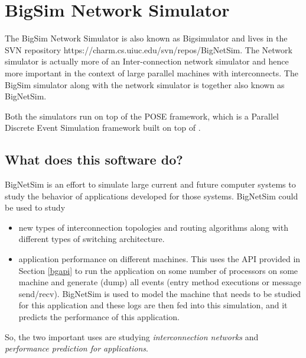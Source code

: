 \section{BigSim Network Simulator}
\label{bignetsim}

The BigSim Network Simulator is also known as Bigsimulator and lives 
in the SVN repository https://charm.cs.uiuc.edu/svn/repos/BigNetSim. 
The Network simulator is actually more of an Inter-connection network 
simulator and hence more important in the context of large parallel
machines with interconnects. 
The BigSim simulator  along with the network simulator is together 
also known as BigNetSim.

Both the simulators run on top of the POSE framework, which is a Parallel
Discrete Event Simulation framework built on top of \charmpp{}.


\subsection{What does this software do?}
BigNetSim is an effort to simulate large current and future computer 
systems to study the behavior of applications developed for those systems. 
BigNetSim could be used to study
\begin{itemize}
\item  new types of interconnection topologies and routing algorithms 
along with different types of switching architecture.
\item application performance on different machines. This uses the API
provided in Section \ref{bgapi} to run the application on some number
of processors on some machine and generate (dump) all events (entry
method executions or message send/recv).  BigNetSim is used to 
model the machine that needs to be studied for this application and
these logs are then fed into this simulation, and it predicts the
performance of this application.
\end{itemize}

So, the two important uses are studying {\it interconnection networks} and
{\it performance prediction for applications}.


